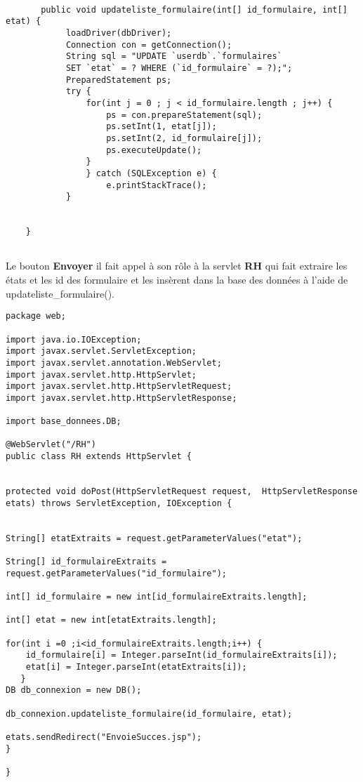 \documentclass[12]{article}
\begin{document}
\lstset{language=java}
\begin{lstlisting}

       public void updateliste_formulaire(int[] id_formulaire, int[] etat) {
    		loadDriver(dbDriver);
    		Connection con = getConnection();
    		String sql = "UPDATE `userdb`.`formulaires`  
    		SET `etat` = ? WHERE (`id_formulaire` = ?);";
    		PreparedStatement ps;
    		try {
    			for(int j = 0 ; j < id_formulaire.length ; j++) {
    				ps = con.prepareStatement(sql);
    				ps.setInt(1, etat[j]);
    				ps.setInt(2, id_formulaire[j]);
    				ps.executeUpdate();
    			}
    			} catch (SQLException e) {
    				e.printStackTrace();
    		}
       
       
    }


\end{lstlisting}
   Le bouton \textbf{Envoyer} il fait appel à son rôle à la servlet \textbf{RH} qui fait extraire les états et les id des formulaire et les insèrent dans la base des données à l'aide de updateliste\_formulaire().
   
\lstset{language=java}
\begin{lstlisting}
package web;

import java.io.IOException;
import javax.servlet.ServletException;
import javax.servlet.annotation.WebServlet;
import javax.servlet.http.HttpServlet;
import javax.servlet.http.HttpServletRequest;
import javax.servlet.http.HttpServletResponse;

import base_donnees.DB;

@WebServlet("/RH")
public class RH extends HttpServlet {
	
	
protected void doPost(HttpServletRequest request,  HttpServletResponse etats) throws ServletException, IOException {

	
String[] etatExtraits = request.getParameterValues("etat");

String[] id_formulaireExtraits = request.getParameterValues("id_formulaire");

int[] id_formulaire = new int[id_formulaireExtraits.length];

int[] etat = new int[etatExtraits.length];

for(int i =0 ;i<id_formulaireExtraits.length;i++) {
    id_formulaire[i] = Integer.parseInt(id_formulaireExtraits[i]);
    etat[i] = Integer.parseInt(etatExtraits[i]);
   }
DB db_connexion = new DB();

db_connexion.updateliste_formulaire(id_formulaire, etat);	

etats.sendRedirect("EnvoieSucces.jsp");
}

}
\end{lstlisting}
\end{document}
